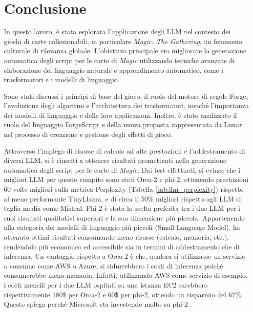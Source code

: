 \chapter*{Conclusione} %

In questo lavoro, è stata esplorata l'applicazione degli LLM nel contesto dei giochi di carte collezionabili, in particolare \emph{Magic: The Gathering}, un fenomeno culturale di rilevanza globale. L'obiettivo principale era migliorare la generazione automatica degli script per le carte di \emph{Magic} utilizzando tecniche avanzate di elaborazione del linguaggio naturale e apprendimento automatico, come i trasformatori e i modelli di linguaggio.

Sono stati discussi i principi di base del gioco, il ruolo del motore di regole Forge, l'evoluzione degli algoritmi e l'architettura dei trasformatori, nonché l'importanza dei modelli di linguaggio e delle loro applicazioni. Inoltre, è stato analizzato il ruolo del linguaggio ForgeScript e della nuova proposta rappresentata da Lunar nel processo di creazione e gestione degli effetti di gioco.

Attraverso l'impiego di risorse di calcolo ad alte prestazioni e l'addestramento di diversi LLM, si è riusciti a ottenere risultati promettenti nella generazione automatica degli script per le carte di \emph{Magic}. Dai test effettuati, si evince che i migliori LLM per questo compito sono stati Orca-2 e phi-2, ottenendo prestazioni 60 volte migliori sulla metrica Perplexity (Tabella \ref{tab:llm_perplexity}) rispetto al meno performante TinyLlama, e di circa il 50\% migliori rispetto agli LLM di taglia media come Mistral. Phi-2 è stata la scelta preferita tra i due LLM per i suoi risultati qualitativi superiori e la sua dimensione più piccola. Appartenendo alla categoria dei modelli di linguaggio più piccoli (Small Language Model), ha ottenuto ottimi risultati consumando meno risorse (calcolo, memoria, etc.), rendendolo più economico ed accessibile sia in termini di addestramento che di inferenza. Un vantaggio rispetto a Orca-2 è che, qualora si utilizzasse un servizio a consumo come AWS o Azure, si ridurrebbero i costi di inferenza poiché consumerebbe meno memoria. Infatti, utilizzando AWS come servizio di esempio, i costi mensili per i due LLM ospitati su una istanza EC2 sarebbero rispettivamente 180\$ per Orca-2 e 60\$ per phi-2, ottendo un risparmio del 67\%. Questo spiega perché Microsoft sta investendo molto su phi-2 \cite{microsoft_loves_slm}.\newline

